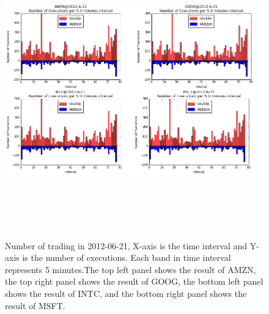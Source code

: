 \begin{figure} [hp]
  \begin{center}
    \includegraphics[width=6in,  height=5in]{figures/execution.png}
  \end{center}
\caption{Number of trading in 2012-06-21,  X-axis is the time interval and Y-axis is the number of executions. Each band in time interval represents 5 minutes.The top left panel shows the result of AMZN,   the top right panel shows the result of GOOG,  the bottom left panel shows the result of INTC,   and the bottom right panel shows the result of MSFT.   } \label{fig:execution}
\end{figure}

